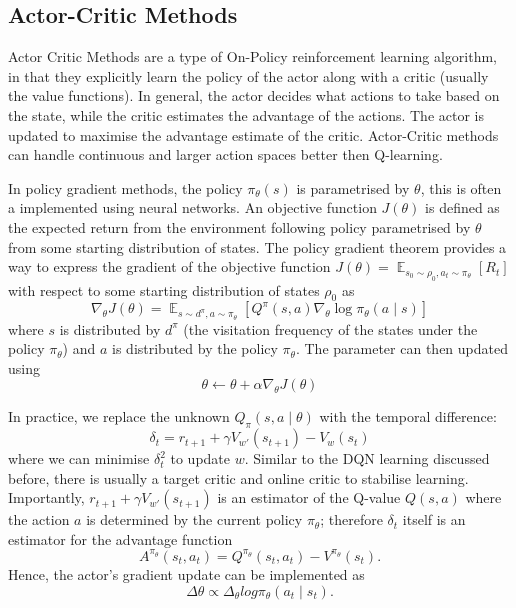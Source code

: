 \documentclass[11pt,a4paper]{report}
\DeclareMathOperator{\EX}{\mathbb{E}}
\begin{document}
\subsection{Actor-Critic Methods}
Actor Critic Methods are a type of On-Policy reinforcement learning algorithm, in that they explicitly learn the policy of the actor along with a critic (usually the value functions). In general, the actor decides what actions to take based on the state, while the critic estimates the advantage of the actions. The actor is updated to maximise the advantage estimate of the critic. Actor-Critic methods can handle continuous and larger action spaces better then Q-learning. \par 
 
In policy gradient methods, the policy $\pi_\theta(s)$ is parametrised by $\theta$, this is often a implemented using neural networks. An objective function $J(\theta)$ is defined as the expected return from the environment following policy parametrised by $\theta$ from some starting distribution of states. The policy gradient theorem provides a way to express the gradient of the objective function $J(\theta) = \EX_{s_0 \sim \rho_0, a_t \sim \pi_\theta} [R_t]$ with respect to some starting distribution of states $\rho_0$ as 
\[
\nabla_{\theta} J(\theta) = \EX_{s \sim d^{\pi}, a \sim \pi_{\theta}} \left[ Q^{\pi}(s, a) \nabla_{\theta} \log \pi_{\theta}(a \mid s) \right]
\]
where $s$ is distributed by $d^\pi$ (the visitation frequency of the states under the policy $\pi_\theta$) and $a$ is distributed by the policy $\pi_\theta$. The parameter can then updated using 
\[
\theta \leftarrow \theta + \alpha \nabla_{\theta} J(\theta)
\] \par

In practice, we replace the unknown $Q_{\pi}(s, a \mid \theta)$ with the temporal difference: 
\[
\delta_t = r_{t+1} + \gamma V_{w'}(s_{t+1}) - V_{w}(s_t)
\]
where we can minimise $\delta_t^2$ to update $w$. 
Similar to the DQN learning discussed before, there is usually a target critic and online critic to stabilise learning. Importantly, $ r_{t+1} + \gamma V_{w'}(s_{t+1})$ is an estimator of the Q-value $Q(s,a)$ where the action $a$ is determined by the current policy $\pi_\theta$; therefore $\delta_t$ itself is an estimator for the advantage function 
\[
  A^{\pi_\theta}(s_t , a_t ) = Q^{\pi_\theta}(s_t, a_t) - V^{\pi_\theta}(s_t).
\] 
Hence, the actor's gradient update can be implemented as 
\[\Delta \theta \propto \Delta_\theta log \pi_\theta (a_t \mid s_t).\]
\end{document}

